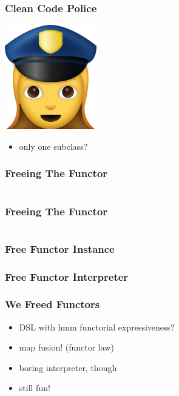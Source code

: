 \documentclass{beamer}
\begin{document}
\begin{frame}[fragile]
  \frametitle{Clean Code Police}
  \begin{center}
    \includegraphics[width=0.3\textwidth]{static-images/police.png}
  \end{center}
  \begin{itemize}
  \item only one subclass?
  \end{itemize}
\end{frame}

\begin{frame}[fragile]
  \frametitle{Freeing The Functor}
  \inputminted{scala}{snippets/free-functor3.scala}
\end{frame}

\begin{frame}[fragile]
  \frametitle{Freeing The Functor}
  \inputminted{scala}{snippets/free-functor4.scala}
\end{frame}

\begin{frame}[fragile]
  \frametitle{Free Functor Instance}
\end{frame}

\begin{frame}[fragile]
  \frametitle{Free Functor Interpreter}
\end{frame}

\begin{frame}
  \frametitle{We Freed Functors}
  \begin{itemize}
  \item<1-> DSL with hmm functorial expressiveness?
  \item<1-> map fusion! (functor law)
  \item<1-> boring interpreter, though
  \item<2-> still fun!
  \end{itemize}
\end{frame}
\end{document}
